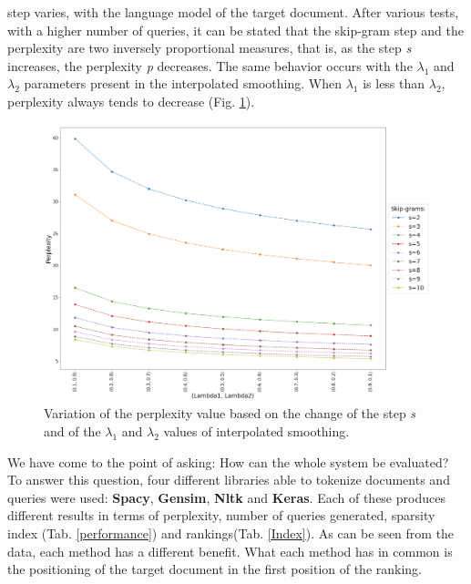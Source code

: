 step varies, with the language model of the target document. After various 
tests, with a higher number of queries, it can be stated that the skip-gram 
step and the perplexity are two inversely proportional measures, that is, as 
the step \emph{s} increases, the perplexity \emph{p} decreases. The same behavior occurs 
with the $\lambda_1$ and $\lambda_2$ parameters present in the interpolated smoothing. When  
$\lambda_1$ is less than  $\lambda_2$, perplexity always tends to decrease (Fig. \ref{perplexity}). 
\begin{figure}[h!]
    \centering
    \includegraphics[width =0.7\linewidth]{images/perplexity.png}
    \centering
    \caption{Variation of the perplexity value based on the change of the step \emph{s} and of the $\lambda_1$ and $\lambda_2$ values of interpolated smoothing.}
    \label{perplexity}
\end{figure}
We have come 
to the point of asking: How can the whole system be evaluated? To answer 
this question, four different libraries able to tokenize documents and queries 
were used: {\bfseries{Spacy}}, {\bfseries{Gensim}}, {\bfseries{Nltk}} and {\bfseries{Keras}}. Each of these produces different 
results in terms of perplexity, number of queries generated, sparsity index 
(Tab. \ref{performance}) and rankings(Tab. \ref{Index}). As can be seen from the data, each method has a different 
benefit. What each method has in common is the positioning of the target 
document in the first position of the ranking.
